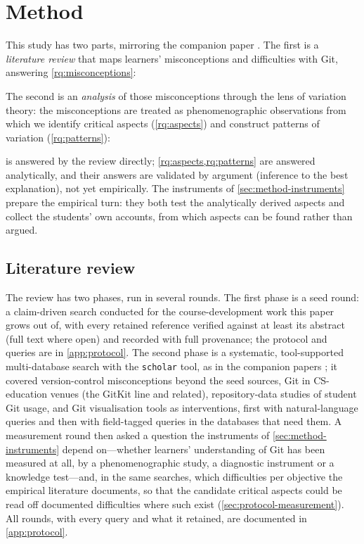 \mode*
\section{Method}

This study has two parts, mirroring the companion paper
\autocite{VTProgMisconceptions}.
The first is a \emph{literature review} that maps learners' misconceptions
and difficulties with Git, answering \cref{rq:misconceptions}:

\rqmisconceptions*

The second is an \emph{analysis} of those misconceptions through the lens
of variation theory: the misconceptions are treated as phenomenographic
observations from which we identify critical aspects (\cref{rq:aspects})
and construct patterns of variation (\cref{rq:patterns}):

\rqaspects*
\rqpatterns*

 is answered by the review directly;
\cref{rq:aspects,rq:patterns} are answered analytically, and their answers
are validated by argument (inference to the best explanation), not yet
empirically.
The instruments of \cref{sec:method-instruments} prepare the empirical
turn: they both test the analytically derived aspects and collect the
students' own accounts, from which aspects can be found rather than
argued.

\subsection{Literature review}
\label{sec:method-litreview}

The review has two phases, run in several rounds.
The first phase is a seed round: a claim-driven search conducted for the
course-development work this paper grows out of, with every retained
reference verified against at least its abstract (full text where open)
and recorded with full provenance; the protocol and queries are in
\cref{app:protocol}.
The second phase is a systematic, tool-supported multi-database search
with the \texttt{scholar} tool, as in the companion papers
\autocite{VTProgMisconceptions,VTDebug}; it covered version-control
misconceptions beyond the seed sources, Git in CS-education venues (the
GitKit line and related), repository-data studies of student Git usage, and
Git visualisation tools as interventions, first with natural-language
queries and then with field-tagged queries in the databases that need
them.
A measurement round then asked a question the instruments of
\cref{sec:method-instruments} depend on---whether learners' understanding
of Git has been measured at all, by a phenomenographic study, a
diagnostic instrument or a knowledge test---and, in the same searches,
which difficulties per objective the empirical literature documents, so
that the candidate critical aspects could be read off documented
difficulties where such exist (\cref{sec:protocol-measurement}).
All rounds, with every query and what it retained, are documented in
\cref{app:protocol}.

